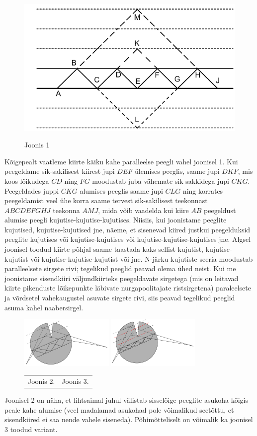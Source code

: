 \solu
\begin{figure}[h]
\centering
\includegraphics[width=0.5\linewidth]{2020-v3g-08-yl1.pdf}\par
Joonis 1
\end{figure}
Kõigepealt vaatleme kiirte käiku kahe paralleelse peegli vahel joonisel 1. Kui peegeldame sik-sakilisest kiirest jupi $DEF$ ülemises peeglis, saame jupi $DKF$, mis koos lõikudega $CD$ ning $FG$ moodustab juba vähemate sik-sakkidega jupi $CKG$. Peegeldades juppi $CKG$  alumises peeglis saame jupi $CLG$ ning korrates peegeldamist veel ühe korra saame tervest sik-sakilisest teekonnast $ABCDEFGHJ$ teekonna $AMJ$, mida võib vaadelda kui kiire $AB$ peegeldust alumise peegli kujutise-kujutise-kujutises. Niisiis, kui joonistame peeglite kujutised, kujutise-kujutised jne, näeme, et sisenevad kiired justkui peegelduksid peeglite kujutises või kujutise-kujutises või kujutise-kujutise-kujutises jne. Algsel joonisel toodud kiirte põhjal saame taastada kaks sellist kujutist, kujutise-kujutist või kujutise-kujutise-kujutist  või jne. N-järku kujutiste seeria moodustab paralleelsete sirgete rivi; tegelikud peeglid peavad olema ühed neist. Kui me joonistame sisendkiiri väljundkiirteks peegeldavate  sirgetega (mis on leitavad kiirte pikenduste lõikepunkte läbivate nurgapoolitajate ristsirgetena) paraleelsete ja võrdsetel vahekaugustel asuvate sirgete rivi, siis peavad tegelikud peeglid asuma kahel naabersirgel.

\begin{figure}[h]
\centering
  \includegraphics[width=0.4\textwidth]{2020-v3g-08-yl2.pdf}
  \includegraphics[width=0.4\textwidth]{2020-v3g-08-yl3.pdf}
  \par
  \begin{tabular}{p{0.5\linewidth}p{0.5\linewidth}}
  \hfil Joonis 2. & \hfil Joonis 3. \\
  \end{tabular}
\end{figure}

Joonisel 2 on näha, et lihtsaimal juhul välistab sisselõige peeglite asukoha kõigis peale kahe alumise (veel madalamad asukohad pole võimalikud seetõttu, et sisendkiired ei saa nende vahele siseneda). Põhimõtteliselt on võimalik ka joonisel 3 toodud variant.
\probend